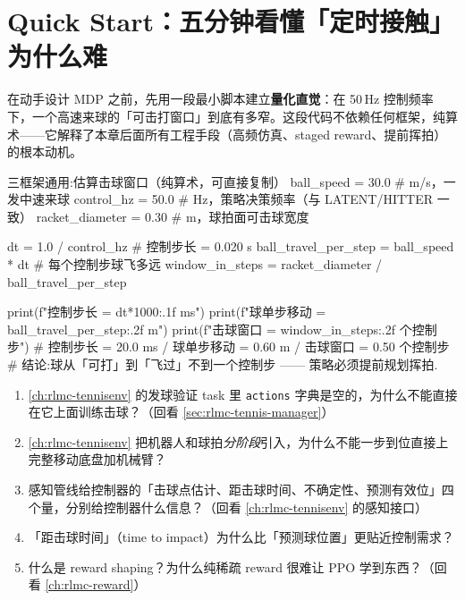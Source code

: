 \section*{Quick Start：五分钟看懂「定时接触」为什么难}
\label{sec:rlmc-strike-quickstart}

在动手设计 MDP 之前，先用一段最小脚本建立\textbf{量化直觉}：在 50\,Hz 控制频率下，一个高速来球的「可击打窗口」到底有多窄。这段代码不依赖任何框架，纯算术——它解释了本章后面所有工程手段（高频仿真、staged reward、提前挥拍）的根本动机。

\begin{codebox}[Python]{三框架通用:估算击球窗口（纯算术，可直接复制）}
ball_speed = 30.0       # m/s，一发中速来球
control_hz = 50.0       # Hz，策略决策频率（与 LATENT/HITTER 一致）
racket_diameter = 0.30  # m，球拍面可击球宽度

dt = 1.0 / control_hz                 # 控制步长 = 0.020 s
ball_travel_per_step = ball_speed * dt # 每个控制步球飞多远
window_in_steps = racket_diameter / ball_travel_per_step

print(f"控制步长       = {dt*1000:.1f} ms")
print(f"球单步移动     = {ball_travel_per_step:.2f} m")
print(f"击球窗口       = {window_in_steps:.2f} 个控制步")
# 控制步长 = 20.0 ms / 球单步移动 = 0.60 m / 击球窗口 = 0.50 个控制步
# 结论:球从「可打」到「飞过」不到一个控制步 —— 策略必须提前规划挥拍.
\end{codebox}

\begin{practice}
\begin{enumerate}
  \item \cref{ch:rlmc-tennisenv} 的发球验证 task 里 \verb|actions| 字典是空的，为什么不能直接在它上面训练击球？（回看 \cref{sec:rlmc-tennis-manager}）
  \item \cref{ch:rlmc-tennisenv} 把机器人和球拍\emph{分阶段}引入，为什么不能一步到位直接上完整移动底盘加机械臂？
  \item 感知管线给控制器的「击球点估计、距击球时间、不确定性、预测有效位」四个量，分别给控制器什么信息？（回看 \cref{ch:rlmc-tennisenv} 的感知接口）
  \item 「距击球时间」（time to impact）为什么比「预测球位置」更贴近控制需求？
  \item 什么是 reward shaping？为什么纯稀疏 reward 很难让 PPO 学到东西？（回看 \cref{ch:rlmc-reward}）
\end{enumerate}
\end{practice}

